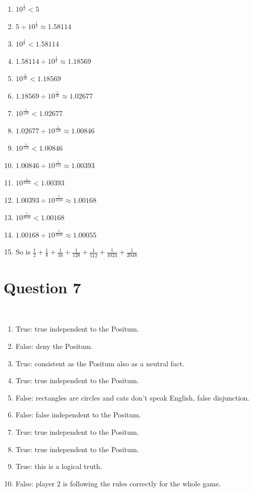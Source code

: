 \documentclass{article}
\begin{document}
\begin{enumerate}
    \item $10^\frac{1}{2}<5$
    \item $5\div 10^\frac{1}{2}\approx1.58114$
    \item $10^\frac{1}{8}<1.58114$
    \item $1.58114\div 10^\frac{1}{8}\approx1.18569$
    \item $10^\frac{1}{16}<1.18569$
    \item $1.18569\div10^\frac{1}{16}\approx1.02677$
    \item $10^\frac{1}{128}<1.02677$
    \item $1.02677\div10^\frac{1}{128}\approx1.00846$
    \item $10^\frac{1}{512}<1.00846$
    \item $1.00846\div10^\frac{1}{512}\approx1.00393$
    \item $10^\frac{1}{1024}<1.00393$
    \item $1.00393\div10^\frac{1}{1024}\approx1.00168$
    \item $10^\frac{1}{2048}<1.00168$
    \item $1.00168\div10^\frac{1}{2048}\approx1.00055$
    \item So is $\boxed{\frac{1}{2}+\frac{1}{8}+\frac{1}{16}+\frac{1}{128}+\frac{1}{512}+\frac{1}{1024}+\frac{1}{2048}}$
\end{enumerate}

\newpage

\section*{Question 7}

~

\begin{enumerate}
    \item True: true independent to the Positum.
    \item False: deny the Positum.
    \item True: consistent as the Positum also as a neutral fact.
    \item True: true independent to the Positum.
    \item False: rectangles are circles and cats don't speak English, false disjunction.
    \item False: false independent to the Positum.
    \item True: true independent to the Positum.
    \item True: true independent to the Positum.
    \item True: this is a logical truth.
    \item False: player 2 is following the rules correctly for the whole game.
\end{enumerate}
\end{document}
